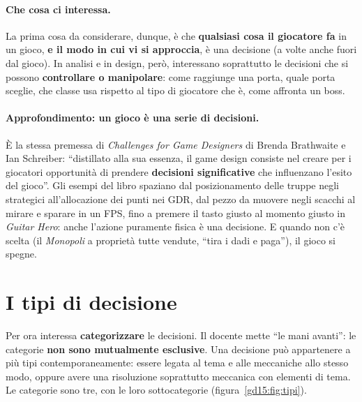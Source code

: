 \paragraph{Che cosa ci interessa.} La prima cosa da considerare, dunque, è
che \textbf{qualsiasi cosa il giocatore fa} in un gioco, \textbf{e il modo
in cui vi si approccia}, è una decisione (a volte anche fuori dal gioco).
In analisi e in design, però, interessano soprattutto le decisioni che si
possono \textbf{controllare o manipolare}: come raggiunge una porta, quale
porta sceglie, che classe usa rispetto al tipo di giocatore che è, come
affronta un boss.

\paragraph{Approfondimento: un gioco è una serie di decisioni.} È la stessa
premessa di \emph{Challenges for Game Designers} di Brenda Brathwaite e Ian
Schreiber: ``distillato alla sua essenza, il game design consiste nel creare
per i giocatori opportunità di prendere \textbf{decisioni significative} che
influenzano l'esito del gioco''. Gli esempi del libro spaziano dal
posizionamento delle truppe negli strategici all'allocazione dei punti nei
GDR, dal pezzo da muovere negli scacchi al mirare e sparare in un FPS, fino a
premere il tasto giusto al momento giusto in \emph{Guitar Hero}: anche
l'azione puramente fisica è una decisione. E quando non c'è scelta (il
\emph{Monopoli} a proprietà tutte vendute, ``tira i dadi e paga''), il
gioco si spegne.

\section{I tipi di decisione}
\label{gd15:sec:tipi}

Per ora interessa \textbf{categorizzare} le decisioni. Il docente mette ``le
mani avanti'': le categorie \textbf{non sono mutualmente esclusive}. Una
decisione può appartenere a più tipi contemporaneamente: essere legata al
tema e alle meccaniche allo stesso modo, oppure avere una risoluzione
soprattutto meccanica con elementi di tema. Le categorie sono tre, con le
loro sottocategorie (figura~\ref{gd15:fig:tipi}).

